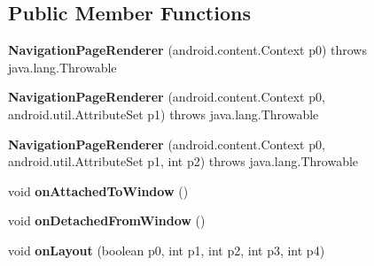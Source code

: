 \subsection*{Public Member Functions}
\begin{DoxyCompactItemize}
\item 
\hypertarget{classmd5eb25e0c6f853c9e5104b7654c9dc6cdf_1_1NavigationPageRenderer_a108edaf639bd63cdb6e86918c96ab068}{}{\bfseries Navigation\+Page\+Renderer} (android.\+content.\+Context p0)  throws java.\+lang.\+Throwable 	\label{classmd5eb25e0c6f853c9e5104b7654c9dc6cdf_1_1NavigationPageRenderer_a108edaf639bd63cdb6e86918c96ab068}

\item 
\hypertarget{classmd5eb25e0c6f853c9e5104b7654c9dc6cdf_1_1NavigationPageRenderer_a1f61d8341d8acb3bdc4793f0465a6d2c}{}{\bfseries Navigation\+Page\+Renderer} (android.\+content.\+Context p0, android.\+util.\+Attribute\+Set p1)  throws java.\+lang.\+Throwable 	\label{classmd5eb25e0c6f853c9e5104b7654c9dc6cdf_1_1NavigationPageRenderer_a1f61d8341d8acb3bdc4793f0465a6d2c}

\item 
\hypertarget{classmd5eb25e0c6f853c9e5104b7654c9dc6cdf_1_1NavigationPageRenderer_ad2d9bf4afbf62251cb1a1832007d7832}{}{\bfseries Navigation\+Page\+Renderer} (android.\+content.\+Context p0, android.\+util.\+Attribute\+Set p1, int p2)  throws java.\+lang.\+Throwable 	\label{classmd5eb25e0c6f853c9e5104b7654c9dc6cdf_1_1NavigationPageRenderer_ad2d9bf4afbf62251cb1a1832007d7832}

\item 
\hypertarget{classmd5eb25e0c6f853c9e5104b7654c9dc6cdf_1_1NavigationPageRenderer_a6aea786f8f918abe4c083ab1ee8f4125}{}void {\bfseries on\+Attached\+To\+Window} ()\label{classmd5eb25e0c6f853c9e5104b7654c9dc6cdf_1_1NavigationPageRenderer_a6aea786f8f918abe4c083ab1ee8f4125}

\item 
\hypertarget{classmd5eb25e0c6f853c9e5104b7654c9dc6cdf_1_1NavigationPageRenderer_ae0da6f2493f29795fb8e8d9221876bc7}{}void {\bfseries on\+Detached\+From\+Window} ()\label{classmd5eb25e0c6f853c9e5104b7654c9dc6cdf_1_1NavigationPageRenderer_ae0da6f2493f29795fb8e8d9221876bc7}

\item 
\hypertarget{classmd5eb25e0c6f853c9e5104b7654c9dc6cdf_1_1NavigationPageRenderer_ae4fa65ddc7fa75351a43bef6e0141f2f}{}void {\bfseries on\+Layout} (boolean p0, int p1, int p2, int p3, int p4)\label{classmd5eb25e0c6f853c9e5104b7654c9dc6cdf_1_1NavigationPageRenderer_ae4fa65ddc7fa75351a43bef6e0141f2f}


\end{DoxyCompactItemize}
